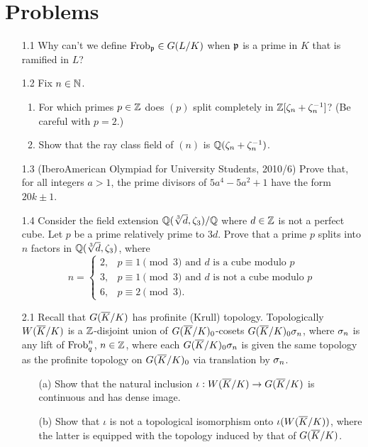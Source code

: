 \section{Problems}
\begin{enumerate}
\item[1.1] Why can't we define $\operatorname{Frob}_{\mathfrak{p}}\in G(L/K)$ when $\mathfrak{p}$ is a prime in $K$ that is ramified in $L$?
\item[1.2] Fix $n\in \mathbb{N}$. 
\begin{enumerate}
\item
For which primes $p\in \mathbb{Z}$ does $(p)$ split completely in $\mathbb{Z}[\zeta_n+\zeta_n^{-1}]$? (Be careful with $p=2$.)
\item
Show that the ray class field of $(n)$ is $\mathbb{Q}(\zeta_n+\zeta_n^{-1})$.
\end{enumerate}
\item[1.3] (IberoAmerican Olympiad for University Students, 2010/6) Prove that, for all integers $a>1$, the prime divisors of $5a^4-5a^2+1$ have the form $20k\pm1$.
\item[1.4] Consider the field extension $\mathbb{Q}(\sqrt[3]{d},\zeta_3)/\mathbb{Q}$ where $d\in\mathbb{Z}$ is not a perfect cube. Let $p$ be a prime relatively prime to $3d$.
Prove that a prime $p$ splits into $n$ factors in $\mathbb{Q}(\sqrt[3]{d},\zeta_3)$, where
\[
n=\begin{cases}
2,&p\equiv 1\pmod 3\text{ and $d$ is a cube modulo }p\\
3,&p\equiv 1\pmod 3\text{ and $d$ is not a cube modulo }p\\
6,&p\equiv 2\pmod 3.
\end{cases}
\]
\item[2.1] %
Recall that $G(\overline{K}/K)$ has profinite (Krull) topology. Topologically $W(\overline{K}/K)$ is a $\mathbb{Z}$-disjoint union of $G(\overline{K}/K)_0$-cosets $G(\overline{K}/K)_0\sigma_n$, where $\sigma_n$ is any lift of $\operatorname{Frob}_q^n$, $n\in \mathbb{Z}$, where each $G(\overline{K}/K)_0\sigma_n$ is given the same topology as the profinite topology on $G(\overline{K}/K)_0$ via translation by $\sigma_n$.
\begin{enumerate}
\item[(a)]
Show that the natural inclusion $\iota:W(\overline{K}/K)\to G(\overline{K}/K)$ is continuous and has dense image.
\item[(b)]
Show that $\iota$ is not a topological isomorphism onto $\iota(W(\overline{K}/K))$, where the latter is equipped with the topology induced by that of $G(\overline{K}/K)$.

\end{enumerate}
\end{enumerate}
